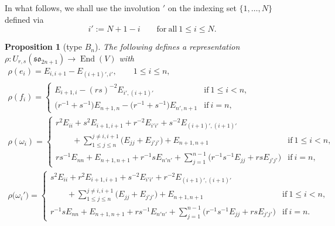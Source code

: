 \documentclass[pdftex]{sigma}
\numberwithin{equation}{section}
\newtheorem{Proposition}[Theorem]{Proposition}
 { \theoremstyle{definition}
\newtheorem{Definition}[Theorem]{Definition}
\newtheorem{Note}[Theorem]{Note}
\newtheorem{Example}[Theorem]{Example}
\newtheorem{Remark}[Theorem]{Remark} }
\DeclareMathOperator{\End}{End}
\newcommand{\sso}{\mathfrak{so}}
\begin{document}
In what follows, we shall use the involution $'$ on the indexing set $\{1, \dots, N\}$ defined via
\[
 i':= N + 1 - i \qquad \mathrm{for\ all} \ 1\leq i\leq N.
\]

\begin{Proposition}[type $B_n$]\label{prp:B_rep}
The following defines a representation $\rho\colon U_{r,s}(\sso_{2n + 1})\to \End(V)$ with
\begin{gather*}
 \rho(e_{i}) = E_{i,i + 1} - E_{(i + 1)',i'},\qquad 1\leq i\leq n , \\
 \rho(f_{i}) =
 \begin{cases}
 E_{i + 1, i} - (rs)^{-2}E_{i', (i + 1)'} & \mathrm{if}\ 1\leq i<n, \\
 \bigl(r^{-1} + s^{-1}\bigr)E_{n + 1,n} - \bigl(r^{-1} + s^{-1}\bigr)E_{n', n + 1} & \mathrm{if}\ i = n,
 \end{cases} \\
 \rho(\omega_{i}) =
 \begin{cases}
 \displaystyle r^{2}E_{ii} + s^{2}E_{i + 1, i + 1} + r^{-2}E_{i'i'} + s^{-2}E_{(i + 1)', (i + 1)'} \\
 \displaystyle \qquad{} + \sum_{1\leq j\leq n}^{j \neq i,i + 1} \bigl(E_{jj}+E_{j'j'}\bigr)
 + E_{n+1,n+1}
 & \mathrm{if}\ 1\leq i<n, \\
 \displaystyle{rs^{-1}E_{nn} + E_{n + 1,n+1} + r^{-1}sE_{n'n'} + \sum_{j = 1}^{n-1}\bigl(r^{-1}s^{-1}E_{jj} + rsE_{j'j'}\bigr)} & \mathrm{if}\ i = n,
 \end{cases} \\
 \rho\bigl(\omega_{i}'\bigr) =
 \begin{cases}
 \displaystyle s^{2}E_{ii} + r^{2}E_{i + 1, i + 1} + s^{-2}E_{i'i'} + r^{-2}E_{(i + 1)', (i + 1)'} \\
 \displaystyle\qquad{}+ \sum_{1\leq j\leq n}^{j \neq i,i + 1} \bigl(E_{jj} + E_{j'j'}\bigr)
 + E_{n+1,n+1}
 & \mathrm{if}\ 1\leq i<n ,\\
 \displaystyle{r^{-1}sE_{nn} + E_{n + 1,n+1} + rs^{-1}E_{n'n'} + \sum_{j = 1}^{n-1}\bigl(r^{-1}s^{-1}E_{jj} + rsE_{j'j'}\bigr)} & \mathrm{if}\ i = n.
\end{cases}
\end{gather*}
\end{Proposition}
\end{document}
